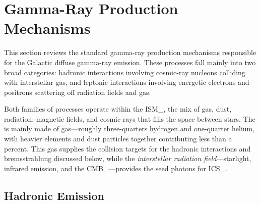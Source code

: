 
\section{Gamma-Ray Production Mechanisms}
\label{sec:production_mechanisms}


This section reviews the standard gamma-ray production mechanisms responsible for the Galactic diffuse gamma-ray emission.
These processes fall mainly into two broad categories: hadronic interactions involving cosmic-ray nucleons colliding with interstellar gas, and leptonic interactions involving energetic electrons and positrons scattering off radiation fields and gas.

Both families of processes operate within the \gls{ISM_}, the mix of gas, dust, radiation, magnetic fields, and cosmic rays that fills the space between stars.
The \ISM is mainly made of gas---roughly three-quarters hydrogen and one-quarter helium, with heavier elements and dust particles together contributing less than a percent.
This gas supplies the collision targets for the hadronic interactions and bremsstrahlung discussed below, while the \emph{interstellar radiation field}---starlight, infrared emission, and the \gls{CMB_}---provides the seed photons for \gls{ICS_}.

\subsection{Hadronic Emission}
\label{sec:hadronic}


